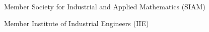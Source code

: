 

\begin{cvskills}

  \cvskill
    {Member} %
    {Society for Industrial and Applied Mathematics (SIAM)} %

  \cvskill
    {Member} %
    {Institute of Industrial Engineers (IIE)} %

\end{cvskills}

